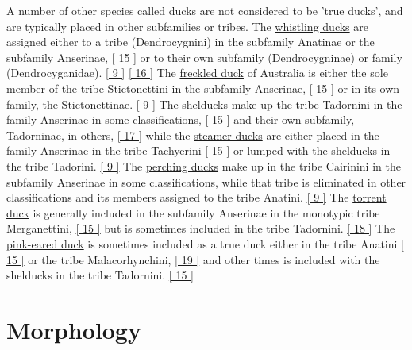 \documentclass[11pt,a4paper]{article}
\begin{document}
A number of other species called ducks are not considered to be 'true ducks', and are typically placed in other subfamilies or tribes. The \href{/wiki/Whistling\_duck}{whistling ducks} are assigned either to a tribe (Dendrocygnini) in the subfamily Anatinae or the subfamily Anserinae, \href{\#cite\_note-FOOTNOTECarboneras1992537-15}{[ 15 ]} or to their own subfamily (Dendrocygninae) or family (Dendrocyganidae). \href{\#cite\_note-FOOTNOTECarboneras1992540-9}{[ 9 ]} \href{\#cite\_note-FOOTNOTEAmerican\_Ornithologists'\_Union1998xix-16}{[ 16 ]} The \href{/wiki/Freckled\_duck}{freckled duck} of Australia is either the sole member of the tribe Stictonettini in the subfamily Anserinae, \href{\#cite\_note-FOOTNOTECarboneras1992537-15}{[ 15 ]} or in its own family, the Stictonettinae. \href{\#cite\_note-FOOTNOTECarboneras1992540-9}{[ 9 ]} The \href{/wiki/Shelduck}{shelducks} make up the tribe Tadornini in the family Anserinae in some classifications, \href{\#cite\_note-FOOTNOTECarboneras1992537-15}{[ 15 ]} and their own subfamily, Tadorninae, in others, \href{\#cite\_note-FOOTNOTEAmerican\_Ornithologists'\_Union1998-17}{[ 17 ]} while the \href{/wiki/Steamer\_duck}{steamer ducks} are either placed in the family Anserinae in the tribe Tachyerini \href{\#cite\_note-FOOTNOTECarboneras1992537-15}{[ 15 ]} or lumped with the shelducks in the tribe Tadorini. \href{\#cite\_note-FOOTNOTECarboneras1992540-9}{[ 9 ]} The \href{/wiki/Perching\_duck}{perching ducks} make up in the tribe Cairinini in the subfamily Anserinae in some classifications, while that tribe is eliminated in other classifications and its members assigned to the tribe Anatini. \href{\#cite\_note-FOOTNOTECarboneras1992540-9}{[ 9 ]} The \href{/wiki/Torrent\_duck}{torrent duck} is generally included in the subfamily Anserinae in the monotypic tribe Merganettini, \href{\#cite\_note-FOOTNOTECarboneras1992537-15}{[ 15 ]} but is sometimes included in the tribe Tadornini. \href{\#cite\_note-FOOTNOTECarboneras1992538-18}{[ 18 ]} The \href{/wiki/Pink-eared\_duck}{pink-eared duck} is sometimes included as a true duck either in the tribe Anatini \href{\#cite\_note-FOOTNOTECarboneras1992537-15}{[ 15 ]} or the tribe Malacorhynchini, \href{\#cite\_note-FOOTNOTEChristidisBoles200862-19}{[ 19 ]} and other times is included with the shelducks in the tribe Tadornini. \href{\#cite\_note-FOOTNOTECarboneras1992537-15}{[ 15 ]}

\section{Morphology}
\end{document}
